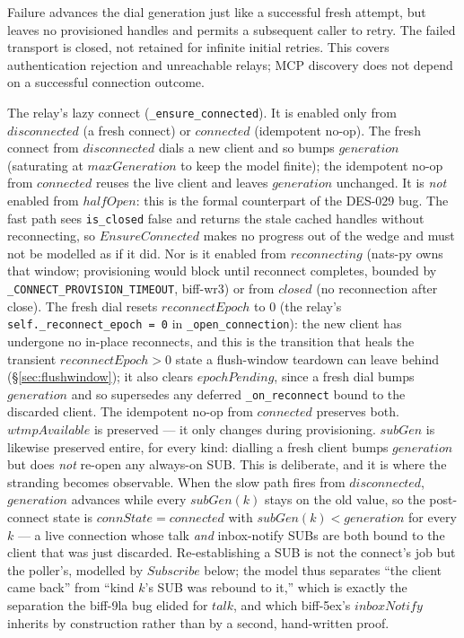 \documentclass[a4paper,10pt,fleqn]{article}
\begin{document}
Failure advances the dial generation just like a successful fresh attempt,
but leaves no provisioned handles and permits a subsequent caller to retry.
The failed transport is closed, not retained for infinite initial retries.
This covers authentication rejection and unreachable relays; MCP discovery
does not depend on a successful connection outcome.

The relay's lazy connect (\texttt{\_ensure\_connected}).  It is
enabled only from $disconnected$ (a fresh connect) or $connected$
(idempotent no-op).  The fresh connect from $disconnected$ dials a
new client and so bumps $generation$ (saturating at
$maxGeneration$ to keep the model finite); the idempotent no-op
from $connected$ reuses the live client and leaves $generation$
unchanged.  It is \emph{not} enabled from $halfOpen$:
this is the formal counterpart of the DES-029 bug.  The fast path
sees \texttt{is\_closed} false and returns the stale cached
handles without reconnecting, so $EnsureConnected$ makes no
progress out of the wedge and must not be modelled as if it did.
Nor is it enabled from $reconnecting$ (nats-py owns that window;
provisioning would block until reconnect completes, bounded by
\texttt{\_CONNECT\_PROVISION\_TIMEOUT}, biff-wr3) or from $closed$
(no reconnection after close).  The fresh dial resets $reconnectEpoch$
to $0$ (the relay's \texttt{self.\_reconnect\_epoch = 0} in
\texttt{\_open\_connection}): the new client has undergone no in-place
reconnects, and this is the transition that heals the transient
$reconnectEpoch > 0$ state a flush-window teardown can leave behind
(\S\ref{sec:flushwindow}); it also clears $epochPending$, since a fresh
dial bumps $generation$ and so supersedes any deferred
\texttt{\_on\_reconnect} bound to the discarded client.  The idempotent
no-op from $connected$ preserves both.  $wtmpAvailable$ is preserved ---
it only changes during provisioning.  $subGen$ is likewise preserved
entire, for every kind: dialling a fresh client bumps $generation$ but does
\emph{not} re-open any always-on SUB.  This is deliberate, and it is where
the stranding becomes observable.  When the slow path fires from
$disconnected$, $generation$ advances while every $subGen(k)$ stays on the
old value, so the post-connect state is $connState = connected$ with
$subGen(k) < generation$ for every $k$ --- a live connection whose talk
\emph{and} inbox-notify SUBs are both bound to the client that was just
discarded.  Re-establishing a SUB is not the connect's job but the
poller's, modelled by $Subscribe$ below; the model thus separates ``the
client came back'' from ``kind $k$'s SUB was rebound to it,'' which is
exactly the separation the biff-9la bug elided for $talk$, and which
biff-5ex's $inboxNotify$ inherits by construction rather than by a second,
hand-written proof.
\end{document}
